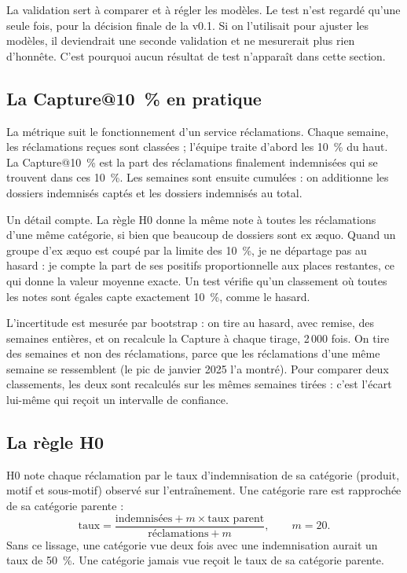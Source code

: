 \documentclass[11pt,a4paper]{article}
\begin{document}
La validation sert à comparer et à régler les modèles. Le test n'est regardé qu'une seule fois, pour la décision finale de la v0.1. Si on l'utilisait pour ajuster les modèles, il deviendrait une seconde validation et ne mesurerait plus rien d'honnête. C'est pourquoi aucun résultat de test n'apparaît dans cette section.

\subsection{La Capture@10~\% en pratique}

La métrique suit le fonctionnement d'un service réclamations. Chaque semaine, les réclamations reçues sont classées ; l'équipe traite d'abord les 10~\% du haut. La Capture@10~\% est la part des réclamations finalement indemnisées qui se trouvent dans ces 10~\%. Les semaines sont ensuite cumulées : on additionne les dossiers indemnisés captés et les dossiers indemnisés au total.

Un détail compte. La règle H0 donne la même note à toutes les réclamations d'une même catégorie, si bien que beaucoup de dossiers sont ex æquo. Quand un groupe d'ex æquo est coupé par la limite des 10~\%, je ne départage pas au hasard : je compte la part de ses positifs proportionnelle aux places restantes, ce qui donne la valeur moyenne exacte. Un test vérifie qu'un classement où toutes les notes sont égales capte exactement 10~\%, comme le hasard.

L'incertitude est mesurée par bootstrap : on tire au hasard, avec remise, des semaines entières, et on recalcule la Capture à chaque tirage, 2\,000 fois. On tire des semaines et non des réclamations, parce que les réclamations d'une même semaine se ressemblent (le pic de janvier 2025 l'a montré). Pour comparer deux classements, les deux sont recalculés sur les mêmes semaines tirées : c'est l'écart lui-même qui reçoit un intervalle de confiance.

\subsection{La règle H0}

H0 note chaque réclamation par le taux d'indemnisation de sa catégorie (produit, motif et sous-motif) observé sur l'entraînement. Une catégorie rare est rapprochée de sa catégorie parente :
\[
\text{taux} = \frac{\text{indemnisées} + m \times \text{taux parent}}{\text{réclamations} + m}, \qquad m = 20.
\]
Sans ce lissage, une catégorie vue deux fois avec une indemnisation aurait un taux de 50~\%. Une catégorie jamais vue reçoit le taux de sa catégorie parente.
\end{document}

